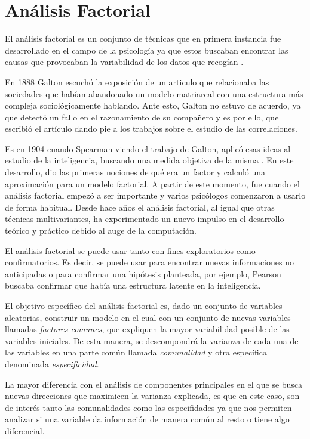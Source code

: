 \newpage
\section{Análisis Factorial}

\noindent El análisis factorial es un conjunto de técnicas que en primera instancia fue desarrollado en el campo de la psicología ya que estos buscaban encontrar las causas que provocaban la variabilidad de los datos que recogían \cite{Vincent 1953}. 

\noindent En 1888 Galton escuchó la exposición de un articulo que relacionaba las sociedades que habían abandonado un modelo matriarcal con una estructura más compleja sociológicamente hablando. Ante esto, Galton no estuvo de acuerdo, ya que detectó un fallo en el razonamiento de su compañero y es por ello, que escribió el artículo  dando pie a los trabajos sobre el estudio de las correlaciones\cite{Galton 1889}.   

\noindent Es en 1904 cuando Spearman  viendo el trabajo de Galton, aplicó esas ideas al estudio de la inteligencia, buscando una medida objetiva de la misma \cite{Spearman 1904}. En este desarrollo, dio las primeras nociones de qué era un factor y calculó una aproximación para un modelo factorial. A partir de este momento, fue cuando el análisis factorial empezó a ser importante y varios psicólogos comenzaron a usarlo de forma habitual. 
Desde hace años el análisis factorial, al igual que otras técnicas multivariantes, ha experimentado un nuevo impulso en el desarrollo teórico y práctico debido al auge de la computación. 

\noindent El análisis factorial se puede usar tanto con fines exploratorios como confirmatorios. Es decir, se puede usar para encontrar nuevas informaciones no anticipadas o para confirmar una hipótesis planteada, por ejemplo, Pearson buscaba confirmar que había una estructura latente en la inteligencia\cite{Hair 1995}.

\noindent El objetivo específico del análisis factorial es, dado un conjunto de variables aleatorias, construir un modelo en el cual con un conjunto de nuevas variables llamadas \emph{factores comunes}, que expliquen la mayor variabilidad posible de las variables iniciales. De esta manera, se descompondrá la varianza de cada una de las variables en una parte común llamada \emph{comunalidad}  y otra específica denominada \emph{especificidad}. 

\noindent La mayor diferencia con el análisis de componentes principales en el que se busca nuevas direcciones que maximicen la varianza explicada, es que en este caso, son de interés tanto las comunalidades como las especifidades ya que nos permiten analizar si una variable da información de manera común al resto o tiene algo diferencial. 

